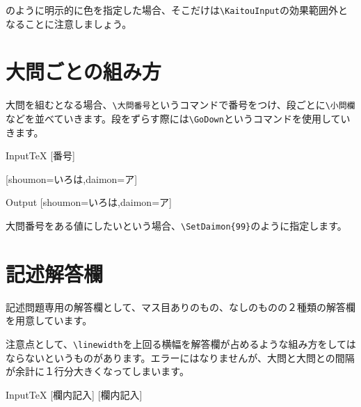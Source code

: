 \documentclass[luatex,fontsize=8pt,paper=b5,twoside]{jlreq}%
\begin{document}
のように明示的に色を指定した場合、そこだけは\verb|\KaitouInput|の効果範囲外となることに注意しましょう。

\section{大問ごとの組み方}
大問を組むとなる場合、\verb|\大問番号|というコマンドで番号をつけ、段ごとに\verb|\小問欄|などを並べていきます。段をずらす際には\verb|\GoDown|というコマンドを使用していきます。

\begin{SourceCode}{Input}{TeX}
  [番号]


  [shoumon=いろは,daimon=ア]
\end{SourceCode}

\begin{OutPut}{Output}
  [shoumon=いろは,daimon=ア]
\end{OutPut}

大問番号をある値にしたいという場合、\verb|\SetDaimon{99}|のように指定します。

\section{記述解答欄}
記述問題専用の解答欄として、マス目ありのもの、なしのものの２種類の解答欄を用意しています。

注意点として、\verb|\linewidth|を上回る横幅を解答欄が占めるような組み方をしてはならないというものがあります。エラーにはなりませんが、大問と大問との間隔が余計に１行分大きくなってしまいます。

\begin{SourceCode}{Input}{TeX}
  [欄内記入]
  [欄内記入]

\end{SourceCode}
\end{document}
